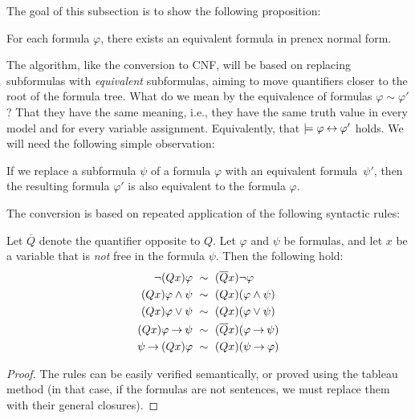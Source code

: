 The goal of this subsection is to show the following proposition:

\begin{proposition}\label{proposition:convert-to-pnf}
    For each formula $\varphi$, there exists an equivalent formula in prenex normal form.    
\end{proposition}

The algorithm, like the conversion to CNF, will be based on replacing subformulas with \emph{equivalent} subformulas, aiming to move quantifiers closer to the root of the formula tree. What do we mean by the equivalence of formulas $\varphi\sim\varphi'$? That they have the same meaning, i.e., they have the same truth value in every model and for every variable assignment. Equivalently, that $\models\varphi\mathbin{\leftrightarrow}\varphi'$ holds. We will need the following simple observation:

\begin{observation}\label{observation:pnf-one-step}
    If we replace a subformula $\psi$ of a formula $\varphi$ with an equivalent formula~$\psi'$, then the resulting formula $\varphi'$ is also equivalent to the formula $\varphi$.
\end{observation}

The conversion is based on repeated application of the following syntactic rules:

\begin{lemma}\label{lemma:pnf-conversion-rules}
    Let $\overline{Q}$ denote the quantifier opposite to $Q$. Let $\varphi$ and $\psi$ be formulas, and let $x$ be a variable that is \emph{not} free in the formula $\psi$. Then the following hold:
    \begin{align*}
        \neg (Qx)\varphi\ &\sim\ (\overline{Q}x)\neg\varphi\\
        (Qx)\varphi \land \psi\ &\sim\ (Qx)(\varphi \land \psi)\\
        (Qx)\varphi \lor \psi\ &\sim\ (Qx)(\varphi \lor \psi)\\
        (Qx)\varphi \mathbin{\rightarrow} \psi\ &\sim\ (\overline{Q}x)(\varphi \mathbin{\rightarrow} \psi)\\
        \psi \mathbin{\rightarrow} (Qx)\varphi\ &\sim\ (Qx)(\psi \mathbin{\rightarrow} \varphi)
    \end{align*}
\end{lemma}
\begin{proof}
    The rules can be easily verified semantically, or proved using the tableau method (in that case, if the formulas are not sentences, we must replace them with their general closures).   
\end{proof}

